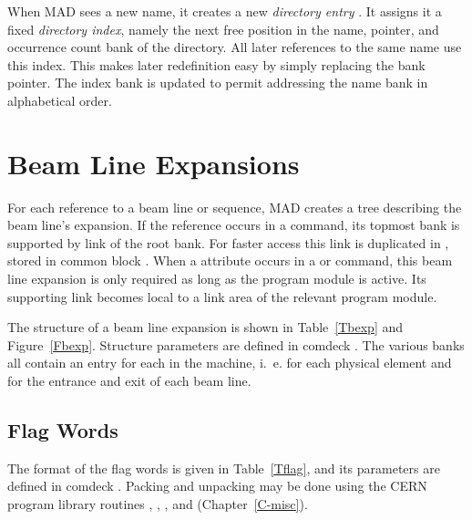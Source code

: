 When MAD sees a new name, it creates a new {\em directory entry}
.
It assigns it a fixed {\em directory index},
namely the next free position in the name, pointer,
and occurrence count bank of the directory.
All later references to the same name use this index.
This makes later redefinition easy by simply replacing the bank pointer.
The index bank is updated to permit addressing the name bank
in alphabetical order.
 
\section{Beam Line Expansions}
\label{Sbeam}
For each reference to a beam line or sequence,
MAD creates a tree describing the beam line's expansion.
If the reference occurs in a  command,
its topmost bank is supported by link  of the root bank.
For faster access this link is duplicated in ,
stored in common block .
When a  attribute occurs in a  or
 command,
this beam line expansion is only required as long as the program
module is active.
Its supporting link becomes local to a link area of the relevant
program module.
 
The structure of a beam line expansion is shown in Table~\ref{Tbexp}
and Figure~\ref{Fbexp}.
Structure parameters are defined in comdeck .
The various banks all contain an entry for each 
in the machine, i.~e. for each physical element and for the entrance
and exit of each beam line.
 
\subsection{Flag Words}
\label{Sflag}
 
The format of the flag words is given in Table~\ref{Tflag},
and its parameters are defined in comdeck .
Packing and unpacking may be done using the CERN program library
routines , , , 
and  (Chapter~\ref{C-misc}).

